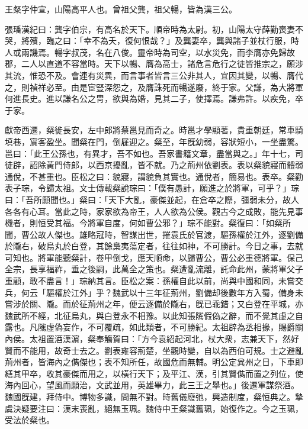 
\begin{pinyinscope}
王粲字仲宣，山陽高平人也。曾祖父龔，祖父暢，皆為漢三公。

張璠漢紀曰：龔字伯宗，有高名於天下。順帝時為太尉。初，山陽太守薛勤喪妻不哭，將殯，臨之曰：「幸不為夭，復何恨哉？」及龔妻卒，龔與諸子並杖行服，時人或兩譏焉。暢字叔茂，名在八俊。靈帝時為司空，以水災免，而李膺亦免歸故郡，二人以直道不容當時。天下以暢、膺為高士，諸危言危行之徒皆推宗之，願涉其流，惟恐不及。會連有災異，而言事者皆言三公非其人，宜因其變，以暢、膺代之，則禎祥必至。由是宦豎深怨之，及膺誅死而暢遂廢，終于家。父謙，為大將軍何進長史。進以謙名公之冑，欲與為婚，見其二子，使擇焉。謙弗許。以疾免，卒于家。

獻帝西遷，粲徙長安，左中郎將蔡邕見而奇之。時邕才學顯著，貴重朝廷，常車騎填巷，賔客盈坐。聞粲在門，倒屣迎之。粲至，年旣幼弱，容狀短小，一坐盡驚。邕曰：「此王公孫也，有異才，吾不如也。吾家書籍文章，盡當與之。」年十七，司徒辟，詔除黃門侍郎，以西京擾亂，皆不就。乃之荊州依劉表。表以粲貌寢而體弱通侻，不甚重也。臣松之曰：貌寢，謂貌負其實也。通侻者，簡易也。表卒。粲勸表子琮，令歸太祖。文士傳載粲說琮曰：「僕有愚計，願進之於將軍，可乎？」琮曰：「吾所願聞也。」粲曰：「天下大亂，豪傑並起，在倉卒之際，彊弱未分，故人各各有心耳。當此之時，家家欲為帝王，人人欲為公侯。觀古今之成敗，能先見事機者，則恒受其福。今將軍自度，何如曹公邪？」琮不能對。粲復曰：「如粲所聞，曹公故人傑也。雄略冠時，智謀出世，摧袁氏於官渡，驅孫權於江外，逐劉備於隴右，破烏丸於白登，其餘梟夷蕩定者，往往如神，不可勝計。今日之事，去就可知也。將軍能聽粲計，卷甲倒戈，應天順命，以歸曹公，曹公必重德將軍。保己全宗，長享福祚，垂之後嗣，此萬全之策也。粲遭亂流離，託命此州，蒙將軍父子重顧，敢不盡言！」琮納其言。臣松之案：孫權自此以前，尚與中國和同，未嘗交兵，何云「驅權於江外」乎？魏武以十三年征荊州，劉備却後數年方入蜀，備身未嘗涉於關、隴。而於征荊州之年，便云逐備於隴右，旣已乖錯；又白登在平城，亦魏武所不經，北征烏丸，與白登永不相豫。以此知張隲假偽之辭，而不覺其虛之自露也。凡隲虛偽妄作，不可覆疏，如此類者，不可勝紀。太祖辟為丞相掾，賜爵關內侯。太祖置酒漢濵，粲奉觴賀曰：「方今袁紹起河北，杖大衆，志兼天下，然好賢而不能用，故奇士去之。劉表雍容荊楚，坐觀時變，自以為西伯可規。士之避亂荊州者，皆海內之儁傑也；表不知所任，故國危而無輔。明公定兾州之日，下車即繕其甲卒，收其豪傑而用之，以橫行天下；及平江、漢，引其賢儁而置之列位，使海內回心，望風而願治，文武並用，英雄畢力，此三王之舉也。」後遷軍謀祭酒。魏國旣建，拜侍中。博物多識，問無不對。時舊儀廢弛，興造制度，粲恒典之。摯虞決疑要注曰：漢末喪亂，絕無玉珮。魏侍中王粲識舊珮，始復作之。今之玉珮，受法於粲也。


\end{pinyinscope}
